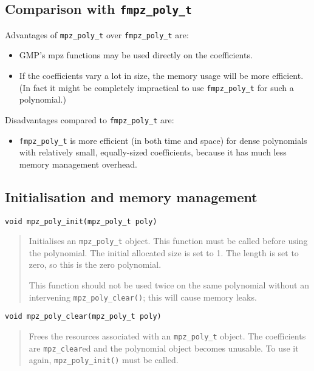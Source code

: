\documentclass[a4paper,10pt]{article}
\newcommand{\code}{\lstinline}
\begin{document}
\subsection{Comparison with \code{fmpz_poly_t}}

Advantages of \code{mpz_poly_t} over \code{fmpz_poly_t} are:
\begin{itemize}
\item GMP's mpz functions may be used directly on the coefficients.
\item If the coefficients vary a lot in size, the memory usage will be more efficient. (In fact it might be completely impractical to use \code{fmpz_poly_t} for such a polynomial.)
\end{itemize}

Disadvantages compared to \code{fmpz_poly_t} are:
\begin{itemize}
\item \code{fmpz_poly_t} is more efficient (in both time and space) for dense polynomials with relatively small, equally-sized coefficients, because it has much less memory management overhead.
\end{itemize}


\subsection{Initialisation and memory management}

\begin{lstlisting}
void mpz_poly_init(mpz_poly_t poly)
\end{lstlisting}
\begin{quote}
Initialises an \code{mpz_poly_t} object. This function must be called before using the polynomial. The initial allocated size is set to 1. The length is set to zero, so this is the zero polynomial. 

This function should not be used twice on the same polynomial without an intervening \code{mpz_poly_clear()}; this will cause memory leaks.
\end{quote}

\begin{lstlisting}
void mpz_poly_clear(mpz_poly_t poly)
\end{lstlisting}
\begin{quote}
Frees the resources associated with an \code{mpz_poly_t} object. The coefficients are \code{mpz_clear}ed and the polynomial object becomes unusable. To use it again, \code{mpz_poly_init()} must be called.
\end{quote}
\end{document}
